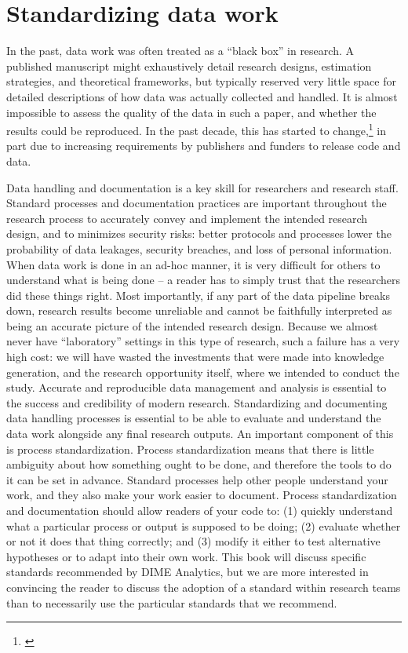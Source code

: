 \documentclass[]{tufte-book}
\begin{document}
\hypertarget{standardizing-data-work}{%
\section*{Standardizing data work}\label{standardizing-data-work}}

In the past, data work was often treated as a ``black box'' in research.
A published manuscript might exhaustively detail research designs,
estimation strategies, and theoretical frameworks, but typically
reserved very little space for detailed descriptions of how data was
actually collected and handled. It is almost impossible to assess the
quality of the data in such a paper, and whether the results could be
reproduced. In the past decade, this has started to change,\footnote{\citet{swanson2020research}}
in part due to increasing requirements by publishers and funders to
release code and data.

Data handling and documentation is a key skill for researchers and
research staff. Standard processes and documentation practices are
important throughout the research process to accurately convey and
implement the intended research design, and to minimizes security risks:
better protocols and processes lower the probability of data leakages,
security breaches, and loss of personal information. When data work is
done in an ad-hoc manner, it is very difficult for others to understand
what is being done -- a reader has to simply trust that the researchers
did these things right. Most importantly, if any part of the data
pipeline breaks down, research results become unreliable and cannot be
faithfully interpreted as being an accurate picture of the intended
research design. Because we almost never have ``laboratory'' settings in
this type of research, such a failure has a very high cost: we will have
wasted the investments that were made into knowledge generation, and the
research opportunity itself, where we intended to conduct the study.
Accurate and reproducible data management and analysis is essential to
the success and credibility of modern research. Standardizing and
documenting data handling processes is essential to be able to evaluate
and understand the data work alongside any final research outputs. An
important component of this is process standardization. Process
standardization means that there is little ambiguity about how something
ought to be done, and therefore the tools to do it can be set in
advance. Standard processes help other people understand your work, and
they also make your work easier to document. Process standardization and
documentation should allow readers of your code to: (1) quickly
understand what a particular process or output is supposed to be doing;
(2) evaluate whether or not it does that thing correctly; and (3) modify
it either to test alternative hypotheses or to adapt into their own
work. This book will discuss specific standards recommended by DIME
Analytics, but we are more interested in convincing the reader to
discuss the adoption of a standard within research teams than to
necessarily use the particular standards that we recommend.
\end{document}
